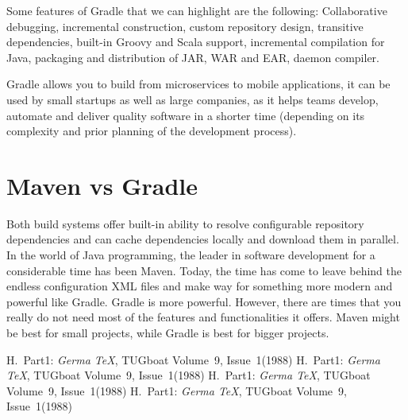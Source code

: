 \documentclass[a4paper,11pt]{article}
\begin{document}
Some features of Gradle that we can highlight are the following: Collaborative debugging,
incremental construction, custom repository design, transitive dependencies, built-in Groovy
and Scala support, incremental compilation for Java, packaging and distribution of JAR,
WAR and EAR, daemon compiler.

Gradle allows you to build from microservices to mobile applications, it can be used by small
startups as well as large companies, as it helps teams develop, automate and deliver quality
software in a shorter time (depending on its complexity and prior planning of the development
process)\cite{Gradle}.

\section{Maven vs Gradle}
Both build systems offer built-in ability to resolve configurable repository dependencies and
can cache dependencies locally and download them in parallel. In the world of Java programming,
the leader in software development for a considerable time has been Maven. Today, the time has
come to leave behind the endless configuration XML files and make way for something more modern
and powerful like Gradle. Gradle is more powerful. However, there are times that you really do
not need most of the features and functionalities it offers. Maven might be best for small
projects, while Gradle is best for bigger projects\cite{DZone}.


\begin{thebibliography}{99}
     H.~Part1: \emph{Germa \TeX}, TUGboat Volume~9, Issue~1(1988) 
     H.~Part1: \emph{Germa \TeX}, TUGboat Volume~9, Issue~1(1988) 
     H.~Part1: \emph{Germa \TeX}, TUGboat Volume~9, Issue~1(1988) 
     H.~Part1: \emph{Germa \TeX}, TUGboat Volume~9, Issue~1(1988) 
\end{thebibliography}
\end{document}
